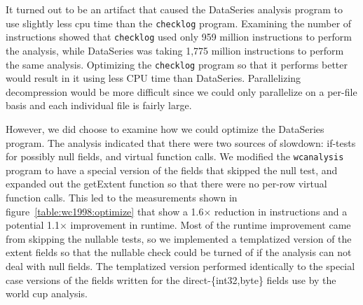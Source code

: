 It turned out to be an artifact that caused the DataSeries analysis
program to use slightly less cpu time than the {\tt checklog} program.
Examining the number of instructions showed that {\tt checklog} used
only 959 million instructions to perform the analysis, while
DataSeries was taking 1,775 million instructions to perform the same
analysis.  Optimizing the {\tt checklog} program so that it performs
better would result in it using less CPU time than DataSeries.
Parallelizing decompression would be more difficult since we could
only parallelize on a per-file basis and each individual file is
fairly large.

However, we did choose to examine how we could optimize the DataSeries
program.  The analysis indicated that there were two sources of
slowdown: if-tests for possibly null fields, and virtual function
calls.  We modified the {\tt wcanalysis} program to have a special
version of the fields that skipped the null test, and expanded out the
getExtent function so that there were no per-row virtual function
calls.  This led to the measurements shown in
figure~\ref{table:wc1998:optimize} that show a 1.6$\times$ reduction
in instructions and a potential 1.1$\times$ improvement in runtime.
Most of the runtime improvement came from skipping the nullable tests,
so we implemented a templatized version of the extent fields so that
the nullable check could be turned of if the analysis can not deal
with null fields.  The templatized version performed identically to
the special case versions of the fields written for the
direct-\{int32,byte\} fields use by the world cup analysis.

